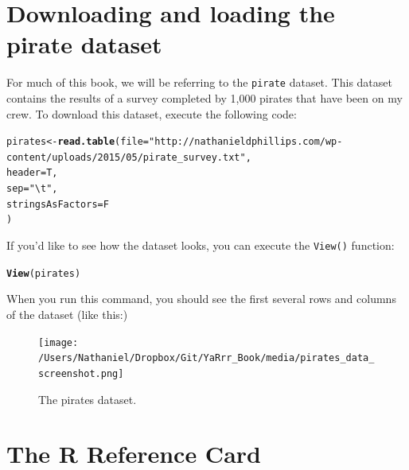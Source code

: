 \documentclass{tufte-book}\usepackage[]{graphicx}\usepackage[]{color}
\makeatletter
\newcommand{\hlstr}[1]{\textcolor[rgb]{0.192,0.494,0.8}{#1}}%
\newcommand{\hlstd}[1]{\textcolor[rgb]{0.345,0.345,0.345}{#1}}%
\newcommand{\hlkwb}[1]{\textcolor[rgb]{0.69,0.353,0.396}{#1}}%
\newcommand{\hlkwc}[1]{\textcolor[rgb]{0.333,0.667,0.333}{#1}}%
\newcommand{\hlkwd}[1]{\textcolor[rgb]{0.737,0.353,0.396}{\textbf{#1}}}%
\newenvironment{kframe}{%
 \def\at@end@of@kframe{}%
 \ifinner\ifhmode%
  \def\at@end@of@kframe{\end{minipage}}%
  \begin{minipage}{\columnwidth}%
 \fi\fi%
 \def\FrameCommand##1{\hskip\@totalleftmargin \hskip-\fboxsep
 \colorbox{shadecolor}{##1}\hskip-\fboxsep
     \hskip-\linewidth \hskip-\@totalleftmargin \hskip\columnwidth}%
 \MakeFramed {\advance\hsize-\width
   \@totalleftmargin\z@ \linewidth\hsize
   \@setminipage}}%
 {\par\unskip\endMakeFramed%
 \at@end@of@kframe}
\newenvironment{knitrout}{}{} %
\makeatother
\begin{document}
\section{Downloading and loading the pirate dataset}

For much of this book, we will be referring to the \texttt{pirate} dataset. This dataset contains the results of a survey completed by 1,000 pirates that have been on my crew. To download this dataset, execute the following code:

\begin{knitrout}
\color{fgcolor}\begin{kframe}
\begin{alltt}
\hlstd{pirates} \hlkwb{<-} \hlkwd{read.table}\hlstd{(}\hlkwc{file} \hlstd{=} \hlstr{"http://nathanieldphillips.com/wp-content/uploads/2015/05/pirate_survey.txt"}\hlstd{,}
           \hlkwc{header} \hlstd{= T,}
           \hlkwc{sep} \hlstd{=} \hlstr{"\textbackslash{}t"}\hlstd{,}
           \hlkwc{stringsAsFactors} \hlstd{= F}
           \hlstd{)}
\end{alltt}
\end{kframe}
\end{knitrout}

If you'd like to see how the dataset looks, you can execute the \texttt{View()} function:

\begin{knitrout}
\color{fgcolor}\begin{kframe}
\begin{alltt}
\hlkwd{View}\hlstd{(pirates)}
\end{alltt}
\end{kframe}
\end{knitrout}

When you run this command, you should see the first several rows and columns of the dataset (like this:)

\begin{figure}
\texttt{[image: /Users/Nathaniel/Dropbox/Git/YaRrr\_Book/media/pirates\_data\_screenshot.png]}
\caption{The pirates dataset.}
\label{fig:piratesdata}
\end{figure}



\section{The R Reference Card}
\end{document}
